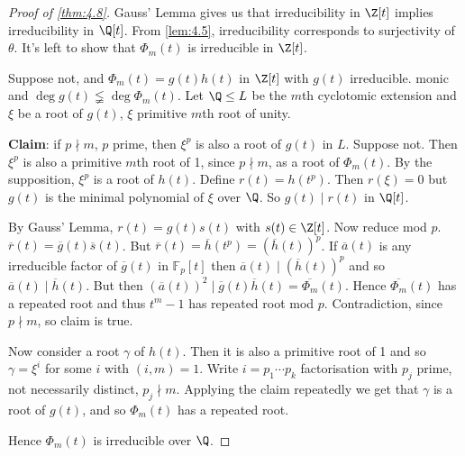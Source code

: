 \documentclass{article}
\DeclareMathOperator{\Gal}{Gal}
\newcommand{\F}{\mathbb{F}}
\begin{document}
\begin{proof}[Proof of \cref{thm:4.8}]
    Gauss' Lemma gives us that irreducibility in $\Z[t]$ implies irreducibility in $\Q[t]$.
    From \cref{lem:4.5}, irreducibility corresponds to surjectivity of $\theta$.
    It's left to show that $\Phi_m(t)$ is irreducible in $\Z[t]$.

    Suppose not, and $\Phi_m(t) = g(t) h(t)$ in $\Z[t]$ with $g(t)$ irreducible. monic and $\deg g(t) \lneqq \deg \Phi_m(t)$.
    Let $\Q \leq L$ be the $m$th cyclotomic extension and $\xi$ be a root of $g(t)$, $\xi$ primitive $m$th root of unity.

    \textbf{Claim}: if $p \nmid m$, $p$ prime, then $\xi^p$ is also a root of $g(t)$ in $L$.
    Suppose not. Then $\xi^p$ is also a primitive $m$th root of 1, since $p \nmid m$, as a root of $\Phi_m(t)$.
    By the supposition, $\xi^p$ is a root of $h(t)$.
    Define $r(t) = h(t^p)$. Then $r(\xi) = 0$ but $g(t)$ is the minimal polynomial of $\xi$ over $\Q$.
    So $g(t) \mid r(t)$ in $\Q[t]$.

    By Gauss' Lemma, $r(t) = g(t) s(t)$ with $s(t) \in \Z[t]$.
    Now reduce mod $p$. $\overline{r}(t) = \overline{g}(t) \overline{s}(t)$.
    But $\overline{r}(t) = \overline{h}(t^p) = (\overline{h}(t))^p$.
    If $\overline{a}(t)$ is any irreducible factor of $\overline{g}(t)$ in $\F_p[t]$ then $\overline{a}(t) \mid (\overline{h}(t))^p$ and so $\overline{a}(t) \mid \overline{h}(t)$.
    But then $(\overline{a}(t))^2 \mid \overline{g}(t) \overline{h}(t) = \overline{\Phi_m}(t)$.
    Hence $\overline{\Phi_m}(t)$ has a repeated root and thus $t^m-1$ has repeated root mod $p$.
    Contradiction, since $p \nmid m$, so claim is true.

    Now consider a root $\gamma$ of $h(t)$.
    Then it is also a primitive root of 1 and so $\gamma = \xi^i$ for some $i$ with $(i, m) = 1$.
    Write $i = p_1 \dotsm p_k$ factorisation with $p_j$ prime, not necessarily distinct, $p_j \nmid m$.
    Applying the claim repeatedly we get that $\gamma$ is a root of $g(t)$, and so $\Phi_m(t)$ has a repeated root.

    Hence $\Phi_m(t)$ is irreducible over $\Q$.
\end{proof}

\end{document}

